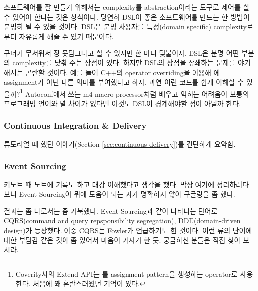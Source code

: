 \documentclass[11pt]{article}
\begin{document}
소프트웨어를 잘 만들기 위해서는 complexity를 abstraction이라는 도구로
제어를 할 수 있어야 한다는 것은 상식이다. 당연히 DSL이 좋은 
소프트웨어를 만드는 한 방법이 분명히 될 수 있을 것이다. DSL은 분명 사용자를
특정(domain specific) complexity로부터 자유롭게 해줄 수 있기 때문이다.

 
구더기 무서워서 장 못담그냐고 할 수 있지만 한 마디 덪붙이자. DSL은 분명
어떤 부분의 complexity를 낮춰 주는 장점이 있다. 하지만  DSL의 장점을 상쇄하는
문제를 야기해서는 곤란할 것이다. 예를 들어 C++의 operator overriding을 이용해 
\mbtt{=}에 assignment가 아닌 다른 의미를 부여했다고 하자. 과연 이런 코드를 쉽게 
이해할 수 있을까?\footnote{Coverity사의 Extend API는 \mbtt{=}를 assignment
pattern을 생성하는 operator로 사용한다. 처음에 꽤 혼란스러웠던 기억이 있다.}
Autoconf에서 쓰는 m4 macro processor처럼 배우고 익히는 어려움이 보통의 
프로그래밍 언어와 별 차이가 없다면 이것도 DSL이 경계해야할 점이 아닐까 한다.

\subsubsection{Continuous Integration \& Delivery}
 
튜토리얼 때 했던 이야기(Section \ref{sec:continuous delivery})를 간단하게 
요약함.  

% 
 
\subsubsection{Event Sourcing}

키노트 때 노트에 기록도 하고 대강 이해했다고 생각을 했다. 막상 여기에
정리하려다 보니 Event Sourcing이 뭐에 도움이 되는 지가 명확하지 않아
구글링을 좀 했다.
 
결과는 좀 나로서는 좀 거북했다. Event Sourcing과 같이 나타나는 단어로
CQRS(command and query repsponsibility segregation), DDD(domain-driven
design)가 등장했다. 이중 CQRS는 Fowler가 언급하기도 한 것이다. 이런
류의 단어에 대한 부담감 같은 것이 좀 있어서 마음이 거시기 한
듯. 궁금하신 분들은 직접 찾아 보시라.
 
\end{document}
